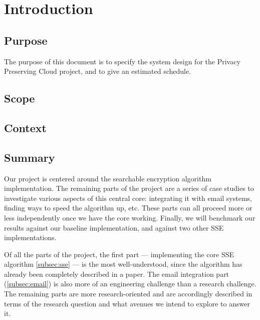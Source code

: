 \documentclass[onecolumn, draftclsnofoot,10pt, compsoc]{IEEEtran}
\begin{document}

\section{Introduction}

\subsection{ Purpose }

The purpose of this document is to specify the system design for the Privacy Preserving Cloud project, and to give an estimated schedule.

\subsection{ Scope }



\subsection{ Context }



\subsection{ Summary }





Our project is centered around the searchable encryption algorithm implementation.
The remaining parts of the project are a series of case studies to investigate various aspects of this central core:
integrating it with email systems,
finding ways to speed the algorithm up, etc. 
These parts can all proceed more or less independently once we have the core working.
Finally, we will benchmark our results against our baseline implementation, and against two other SSE implementations.


Of all the parts of the project, the first part --- implementing the core SSE algorithm \ref{subsec:sse} --- is the most well-understood, since the algorithm has already been completely described in a paper.
The email integration part (\ref{subsec:email}) is also more of an engineering challenge than a research challenge. 
The remaining parts are more research-oriented and are accordingly described in terms of the research question and what avenues we intend to explore to answer it.
\end{document}
